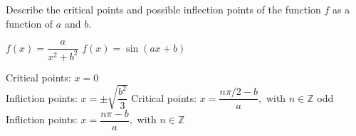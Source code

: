 \ifanalysis
\begin{Exercise} Describe the critical points and possible inflection points of the function $f$ as a function of $a$ and $b$. 
\begin{multicols}{2}
	\Question[difficulty = 1] $f(x) = \dfrac{a}{x^2+b^2}$
	\Question[difficulty = 2] $f(x) = \sin (ax+b)$
    \EndCurrentQuestion
\end{multicols}

\end{Exercise}

\begin{Answer}\phantom{}
    
	\Question 
	Critical points: $x=0$  \\
	Infliction points: $x=\pm \sqrt{\dfrac{b^2}{3}}$
	\Question 
	Critical points: $x=\dfrac{n \pi/2-b}{a},$ with $n \in \mathbb{Z}$ odd \\
	Infliction points: $x=\dfrac{n \pi-b}{a},$ with $n \in \mathbb{Z}$
   
\end{Answer}

\fi